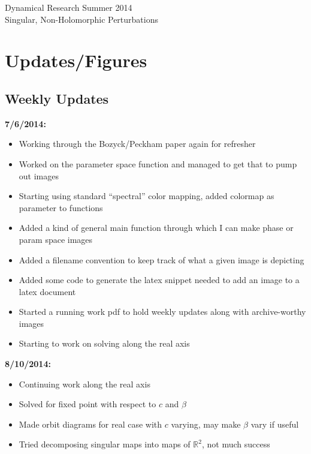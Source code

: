 \documentclass[10pt]{article}
\begin{document}
\begin{center}
	\Large Dynamical Research Summer 2014\\
	Singular, Non-Holomorphic Perturbations
\end{center}

\section{Updates/Figures}

\subsection{Weekly Updates}

\textbf{7/6/2014:}

\begin{itemize}
	\item Working through the Bozyck/Peckham paper again for refresher
	\item Worked on the parameter space function and managed to get that to pump out images
	\item Starting using standard ``spectral'' color mapping, added colormap as parameter to functions
	\item Added a kind of general main function through which I can make phase or param space images
	\item Added a filename convention to keep track of what a given image is depicting
	\item Added some code to generate the latex snippet needed to add an image to a latex document
	\item Started a running work pdf to hold weekly updates along with archive-worthy images
	\item Starting to work on solving along the real axis
\end{itemize}

\textbf{8/10/2014:}

\begin{itemize}
	\item Continuing work along the real axis
	\item Solved for fixed point with respect to $c$ and $\beta$
	\item Made orbit diagrams for real case with $c$ varying, may make $\beta$ vary if useful
	\item Tried decomposing singular maps into maps of $\mathbb{R}^2$, not much success
\end{itemize}

\newpage
\end{document}
